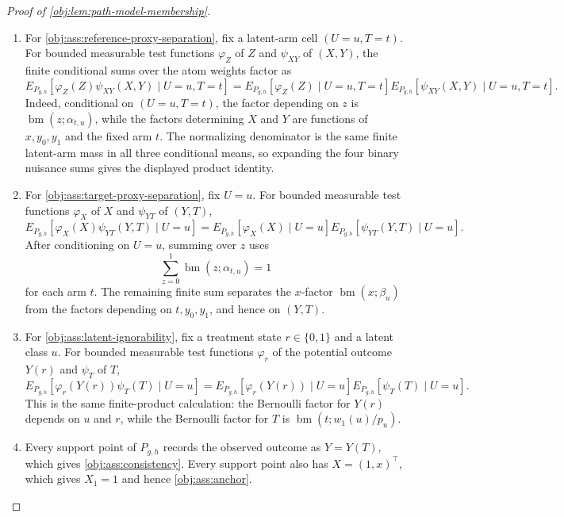 \begin{proof}[Proof of \cref{obj:lem:path-model-membership}]
\begin{enumerate}
\item For \cref{obj:ass:reference-proxy-separation}, fix a latent-arm cell \((U=u,T=t)\).  For bounded measurable test functions \(\varphi_Z\) of \(Z\) and \(\psi_{XY}\) of \((X,Y)\), the finite conditional sums over the atom weights factor as
\[
E_{P_{g,h}}\!\left[
\varphi_Z(Z)\psi_{XY}(X,Y)\mid U=u,T=t
\right]
=
E_{P_{g,h}}\!\left[
\varphi_Z(Z)\mid U=u,T=t
\right]
E_{P_{g,h}}\!\left[
\psi_{XY}(X,Y)\mid U=u,T=t
\right].
\]
Indeed, conditional on \((U=u,T=t)\), the factor depending on \(z\) is
\(\operatorname{bm}(z;\alpha_{t,u})\), while the factors determining \(X\) and \(Y\) are functions of \(x,y_0,y_1\) and the fixed arm \(t\).  The normalizing denominator is the same finite latent-arm mass in all three conditional means, so expanding the four binary nuisance sums gives the displayed product identity. %

\item For \cref{obj:ass:target-proxy-separation}, fix \(U=u\).  For bounded measurable test functions \(\varphi_X\) of \(X\) and \(\psi_{YT}\) of \((Y,T)\),
\[
E_{P_{g,h}}\!\left[
\varphi_X(X)\psi_{YT}(Y,T)\mid U=u
\right]
=
E_{P_{g,h}}\!\left[
\varphi_X(X)\mid U=u
\right]
E_{P_{g,h}}\!\left[
\psi_{YT}(Y,T)\mid U=u
\right].
\]
After conditioning on \(U=u\), summing over \(z\) uses
\[
\sum_{z=0}^1\operatorname{bm}(z;\alpha_{t,u})=1
\]
for each arm \(t\).  The remaining finite sum separates the \(x\)-factor \(\operatorname{bm}(x;\beta_u)\) from the factors depending on \(t,y_0,y_1\), and hence on \((Y,T)\). %

\item For \cref{obj:ass:latent-ignorability}, fix a treatment state \(r\in\{0,1\}\) and a latent class \(u\).  For bounded measurable test functions \(\varphi_r\) of the potential outcome \(Y(r)\) and \(\psi_T\) of \(T\),
\[
E_{P_{g,h}}\!\left[
\varphi_r(Y(r))\psi_T(T)\mid U=u
\right]
=
E_{P_{g,h}}\!\left[
\varphi_r(Y(r))\mid U=u
\right]
E_{P_{g,h}}\!\left[
\psi_T(T)\mid U=u
\right].
\]
This is the same finite-product calculation: the Bernoulli factor for \(Y(r)\) depends on \(u\) and \(r\), while the Bernoulli factor for \(T\) is \(\operatorname{bm}(t;w_1(u)/p_u)\). %

\item Every support point of \(P_{g,h}\) records the observed outcome as \(Y=Y(T)\), which gives \cref{obj:ass:consistency}.  Every support point also has \(X=(1,x)^\top\), which gives \(X_1=1\) and hence \cref{obj:ass:anchor}. %


\end{enumerate}
\end{proof}
